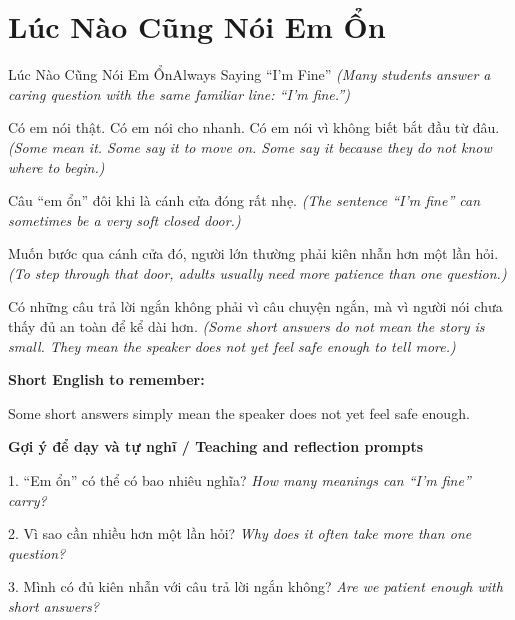 \section{Lúc Nào Cũng Nói Em Ổn}
\begin{truyen}{Lúc Nào Cũng Nói Em Ổn}{Always Saying “I’m Fine”}
\textit{(Many students answer a caring question with the same familiar line: “I’m fine.”)}

Có em nói thật. Có em nói cho nhanh. Có em nói vì không biết bắt đầu từ đâu.
\textit{(Some mean it. Some say it to move on. Some say it because they do not know where to begin.)}

Câu “em ổn” đôi khi là cánh cửa đóng rất nhẹ.
\textit{(The sentence “I’m fine” can sometimes be a very soft closed door.)}

Muốn bước qua cánh cửa đó, người lớn thường phải kiên nhẫn hơn một lần hỏi.
\textit{(To step through that door, adults usually need more patience than one question.)}

\end{truyen}

\begin{baihoc}
Có những câu trả lời ngắn không phải vì câu chuyện ngắn, mà vì người nói chưa thấy đủ an toàn để kể dài hơn.
\textit{(Some short answers do not mean the story is small. They mean the speaker does not yet feel safe enough to tell more.)}
\end{baihoc}

\begin{ghinhoanh}
\textbf{Short English to remember:}

Some short answers simply mean the speaker does not yet feel safe enough.

\end{ghinhoanh}

\begin{tuhocnhanh}
\textbf{Gợi ý để dạy và tự nghĩ / Teaching and reflection prompts}

1. “Em ổn” có thể có bao nhiêu nghĩa? \textit{How many meanings can “I’m fine” carry?}

2. Vì sao cần nhiều hơn một lần hỏi? \textit{Why does it often take more than one question?}

3. Mình có đủ kiên nhẫn với câu trả lời ngắn không? \textit{Are we patient enough with short answers?}
\end{tuhocnhanh}
\ngancach

